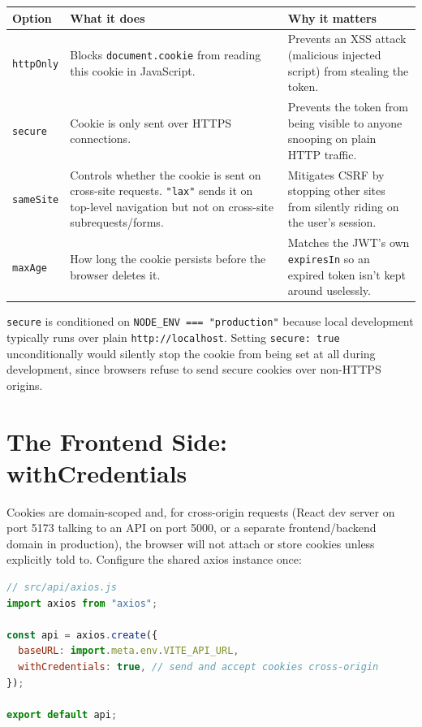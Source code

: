 \begin{center}
\begin{tabularx}{\textwidth}{lXX}
\toprule
\textbf{Option} & \textbf{What it does} & \textbf{Why it matters} \\
\midrule
\texttt{httpOnly} & Blocks \texttt{document.cookie} from reading this cookie in JavaScript. & Prevents an XSS attack (malicious injected script) from stealing the token. \\
\texttt{secure} & Cookie is only sent over HTTPS connections. & Prevents the token from being visible to anyone snooping on plain HTTP traffic. \\
\texttt{sameSite} & Controls whether the cookie is sent on cross-site requests. \texttt{"lax"} sends it on top-level navigation but not on cross-site subrequests/forms. & Mitigates CSRF by stopping other sites from silently riding on the user's session. \\
\texttt{maxAge} & How long the cookie persists before the browser deletes it. & Matches the JWT's own \texttt{expiresIn} so an expired token isn't kept around uselessly. \\
\bottomrule
\end{tabularx}
\end{center}

\begin{notebox}[NOTE]
\texttt{secure} is conditioned on \texttt{NODE\_ENV === "production"} because
local development typically runs over plain \texttt{http://localhost}. Setting
\texttt{secure: true} unconditionally would silently stop the cookie from
being set at all during development, since browsers refuse to send secure
cookies over non-HTTPS origins.
\end{notebox}

\section{The Frontend Side: withCredentials}

Cookies are domain-scoped and, for cross-origin requests (React dev server
on port 5173 talking to an API on port 5000, or a separate frontend/backend
domain in production), the browser will not attach or store cookies unless
explicitly told to. Configure the shared axios instance once:

\begin{lstlisting}[language=JavaScript]
// src/api/axios.js
import axios from "axios";

const api = axios.create({
  baseURL: import.meta.env.VITE_API_URL,
  withCredentials: true, // send and accept cookies cross-origin
});

export default api;
\end{lstlisting}

